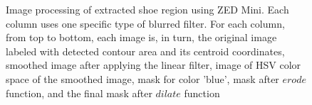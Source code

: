 \begin{figure}

\caption{Image processing of extracted shoe region using ZED Mini. Each column uses one specific type of blurred filter. For each column, from top to bottom, each image is, in turn, the original image labeled with detected contour area and its centroid coordinates, smoothed image after applying the linear filter, image of HSV color space of the smoothed image, mask for color 'blue', mask after $erode$ function, and the final mask after $dilate$ function}
\label{zedfilter}
\end{figure}

